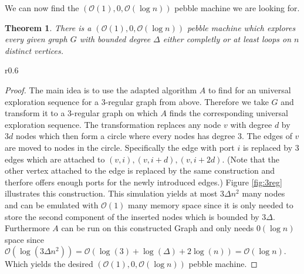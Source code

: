 \documentclass[draft,oneside]{scrartcl}
\newtheorem{thm}{Theorem}
\begin{document}
We can now find the $(\mathcal{O}(1),0,\mathcal{O}(\log n))$ pebble machine we
are looking for.
\begin{thm}
  \label{thm:pebblewalk}
  There is a $(\mathcal{O}(1),0,\mathcal{O}(\log n))$ pebble machine which
  explores every given graph $G$ with bounded degree $\Delta$ either completly
  or at least loops on $n$ distinct vertices.
\end{thm}
\begin{wrapfigure}{r}{0.6\textwidth}
  \caption{Illustration how to transform any graph to a 3-regular graph.}
  \label{fig:3reg}
  \resizebox{0.6\textwidth}{!}{}
\end{wrapfigure}
\begin{proof}
  The main idea is to use the adapted algorithm $A$ to find for an
  universal exploration sequence for a 3-regular graph from above. Therefore
  we take $G$ and transform it to a 3-regular graph on which $A$ finds the
  corresponding universal exploration sequence. The transformation replaces
  any node $v$ with degree $d$ by $3d$ nodes which then form a circle where
  every nodes has degree $3$. The edges of $v$ are moved to nodes in the
  circle. Specifically the edge with port $i$ is replaced by 3 edges which are
  attached to $(v,i), (v,i+d), (v,i+2d)$. (Note that the other
  vertex attached to the edge is replaced by the same construction and therfore
  offers enough ports for the newly introduced edges.) Figure \ref{fig:3reg}
  illustrates this construction.  This simulation yields at most
  $3\Delta n^{2}$ many nodes and can be emulated with $\mathcal{O}(1)$ many
  memory space since it is only needed to store the second component of the
  inserted nodes which is bounded by $3\Delta$. Furthermore $A$ can be run on
  this constructed Graph and only needs $\mathcal{0}(\log n)$ space since
  $\mathcal{O}(\log(3\Delta n^{2})) = \mathcal{O}(\log(3) + \log(\Delta) +
  2\log(n)) = \mathcal{O}(\log n)$. Which yields the desired
  $(\mathcal{O}(1),0,\mathcal{O}(\log n))$ pebble machine.
\end{proof}
\end{document}
